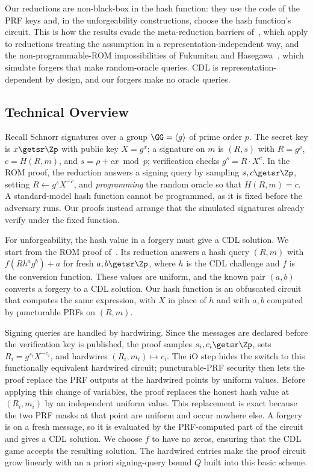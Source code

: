 Our reductions are non-black-box in the hash function: they use the code of the PRF keys and, in the unforgeability constructions, choose the hash function's circuit. This is how the results evade the meta-reduction barriers of~\cite{AC:PaiVer05,C:GarBhaLok08,EC:Seurin12,JC:FleJagSch19}, which apply to reductions treating the assumption in a representation-independent way, and the non-programmable-ROM impossibilities of Fukumitsu and Hasegawa~\cite{FukumitsuH21}, which simulate forgers that make random-oracle queries. CDL is representation-dependent by design, and our forgers make no oracle queries.

\subsection{Technical Overview} \label{sec-techov}

 Recall Schnorr signatures over a group $\GG = \langle g \rangle$ of prime order $p$. The secret key is $x \getsr \Zp$ with public key $X = g^x$; a signature on $m$ is $(R, s)$ with $R = g^\rho$, $c = H(R, m)$, and $s = \rho + cx \bmod p$; verification checks $g^s = R \cdot X^c$. In the ROM proof, the reduction answers a signing query by sampling $s, c \getsr \Zp$, setting $R \gets g^s X^{-c}$, and \emph{programming} the random oracle so that $H(R,m) = c$. A standard-model hash function cannot be programmed, as it is fixed before the adversary runs. Our proofs instead arrange that the simulated signatures already verify under the fixed function.

 For unforgeability, the hash value in a forgery must give a CDL solution. We start from the ROM proof of~\cite{C:CFOS25}. Its reduction answers a hash query $(R,m)$ with $f(Rh^ag^b)+a$ for fresh $a,b\getsr\Zp$, where $h$ is the CDL challenge and $f$ is the conversion function. These values are uniform, and the known pair $(a,b)$ converts a forgery to a CDL solution. Our hash function is an obfuscated circuit that computes the same expression, with $X$ in place of $h$ and with $a,b$ computed by puncturable PRFs on $(R,m)$.

Signing queries are handled by hardwiring. Since the messages are declared before the verification key is published, the proof samples $s_i,c_i\getsr\Zp$, sets $R_i=g^{s_i}X^{-c_i}$, and hardwires $(R_i,m_i)\mapsto c_i$. The iO step hides the switch to this functionally equivalent hardwired circuit; puncturable-PRF security then lets the proof replace the PRF outputs at the hardwired points by uniform values. Before applying this change of variables, the proof replaces the honest hash value at $(R_i,m_i)$ by an independent uniform value. This replacement is exact because the two PRF masks at that point are uniform and occur nowhere else. A forgery is on a fresh message, so it is evaluated by the PRF-computed part of the circuit and gives a CDL solution. We choose $f$ to have no zeros, ensuring that the CDL game accepts the resulting solution. The hardwired entries make the proof circuit grow linearly with an a priori signing-query bound $Q$ built into this basic scheme.

